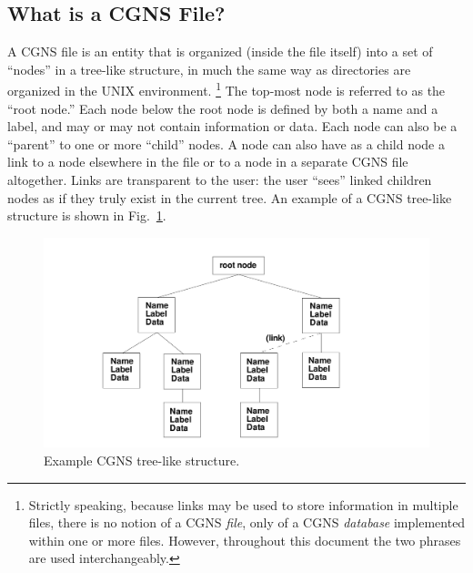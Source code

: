 \documentclass[12pt]{article}
\begin{document}
\subsection{What is a CGNS File?}

A CGNS file is an entity that is
organized (inside the file itself) into a set of ``nodes'' in a tree-like
structure, in much the same way as directories are
organized in the UNIX environment.  \footnote{Strictly speaking, because links may be used
to store information in multiple files, there is no notion of a
CGNS {\it file}, only of a CGNS {\it database} implemented within one or
more files.  However, throughout this document the two phrases are
used interchangeably.}
The top-most node is referred to
as the ``root node.''  Each node below the root node
is defined by both a name and a label, and
may or may not contain information or data.  
Each node can also be a ``parent'' to one or more
``child'' nodes.  A node can also have as a child node a link
to a node elsewhere in the file or to a node in a separate
CGNS file altogether.  Links are transparent to the user:
the user ``sees'' linked children nodes as
if they truly exist in the current tree.
An example of a CGNS tree-like structure is shown in 
Fig.~\ref{FIGintro}.

\begin{figure}[hpbt]
\centerline{{\includegraphics[width=150mm]{figures/intro}}}
\caption{Example CGNS tree-like structure.}
\label{FIGintro}
\end{figure}
%
\end{document}
